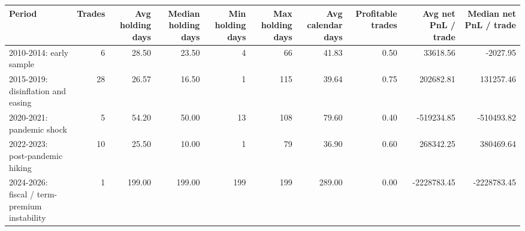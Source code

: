\begin{tabular}{lrrrrrrrrr}
\toprule
Period & Trades & Avg holding days & Median holding days & Min holding days & Max holding days & Avg calendar days & Profitable trades & Avg net PnL / trade & Median net PnL / trade \\
\midrule
2010-2014: early sample & 6 & 28.50 & 23.50 & 4 & 66 & 41.83 & 0.50 & 33618.56 & -2027.95 \\
2015-2019: disinflation and easing & 28 & 26.57 & 16.50 & 1 & 115 & 39.64 & 0.75 & 202682.81 & 131257.46 \\
2020-2021: pandemic shock & 5 & 54.20 & 50.00 & 13 & 108 & 79.60 & 0.40 & -519234.85 & -510493.82 \\
2022-2023: post-pandemic hiking & 10 & 25.50 & 10.00 & 1 & 79 & 36.90 & 0.60 & 268342.25 & 380469.64 \\
2024-2026: fiscal / term-premium instability & 1 & 199.00 & 199.00 & 199 & 199 & 289.00 & 0.00 & -2228783.45 & -2228783.45 \\
\bottomrule
\end{tabular}
